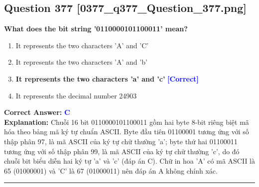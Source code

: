 \documentclass[11pt,a4paper]{article}
\begin{document}
\begin{minipage}{\textwidth}
\subsection*{Question 377 \quad \footnotesize{[0377\_q377\_Question\_377.png]}}
\noindent \textbf{What does the bit string '0110000101100011' mean?}

\begin{enumerate}[label=\Alph*.]
    \item It represents the two characters 'A' and 'C'
    \item It represents the two characters 'A' and 'b'
    \item \textbf{It represents the two characters 'a' and 'c'} \hfill \textcolor{blue}{\textbf{[Correct]}}
    \item It represents the decimal number 24903
\end{enumerate}

\noindent \textbf{Correct Answer:} \textcolor{blue}{\textbf{C}} \\[2pt]
\noindent \textbf{Explanation:} Chuỗi 16 bit 0110000101100011 gồm hai byte 8-bit riêng biệt mã hóa theo bảng mã ký tự chuẩn ASCII. Byte đầu tiên 01100001 tương ứng với số thập phân 97, là mã ASCII của ký tự chữ thường 'a'; byte thứ hai 01100011 tương ứng với số thập phân 99, là mã ASCII của ký tự chữ thường 'c', do đó chuỗi bit biểu diễn hai ký tự 'a' và 'c' (đáp án C). Chữ in hoa 'A' có mã ASCII là 65 (01000001) và 'C' là 67 (01000011) nên đáp án A không chính xác.

\par\vspace{0.3cm}
\hrule
\vspace{0.3cm}
\end{minipage}
\end{document}
